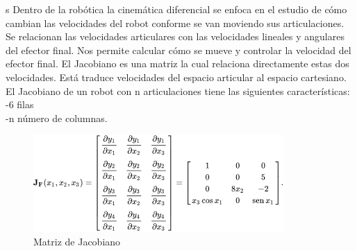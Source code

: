 s
Dentro de la robótica la cinemática diferencial se enfoca en el estudio de cómo cambian las velocidades del robot conforme se van moviendo sus articulaciones. Se relacionan las velocidades articulares con las velocidades lineales y angulares del efector final. Nos permite calcular cómo se mueve y controlar la velocidad del efector final. 
El Jacobiano es una matriz la cual relaciona directamente estas dos velocidades. Está traduce velocidades del espacio articular al espacio cartesiano. El Jacobiano de un robot con n articulaciones tiene las siguientes características:
  \\
-6 filas \\
-n número de columnas.\\

\begin{figure}[h]
	\centering
	\includegraphics[width=0.5\linewidth]{img/jacobiano}
	\caption{Matriz de Jacobiano}
	\label{fig:jacobiano}
\end{figure}